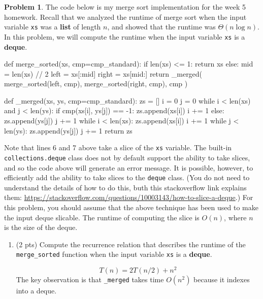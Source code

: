 \documentclass[12pt]{exam}
\theoremstyle{definition}
\newtheorem{problem}{Problem}
\begin{document}
\newpage
\begin{problem}
    The code below is my merge sort implementation for the week 5 homework.
    Recall that we analyzed the runtime of merge sort when the input variable \lstinline{xs} was a \textbf{list} of length $n$,
    and showed that the runtime was $\Theta(n \log n)$.
    In this problem, we will compute the runtime when the input variable \lstinline{xs} is a \textbf{deque}.
\begin{python}
def merge_sorted(xs, cmp=cmp_standard):
    if len(xs) <= 1:
        return xs
    else:
        mid = len(xs) // 2
        left = xs[:mid]
        right = xs[mid:]
        return _merged(
            merge_sorted(left, cmp),
            merge_sorted(right, cmp),
            cmp
            )

def _merged(xs, ys, cmp=cmp_standard):
    zs = []
    i = 0
    j = 0
    while i < len(xs) and j < len(ys):
        if cmp(xs[i], ys[j]) == -1:
            zs.append(xs[i])
            i += 1
        else:
            zs.append(ys[j])
            j += 1
    while i < len(xs):
        zs.append(xs[i])
        i += 1
    while j < len(ys):
        zs.append(ys[j])
        j += 1
    return zs
\end{python}
    \noindent
    Note that lines 6 and 7 above take a slice of the \lstinline{xs} variable.
    The built-in \lstinline{collections.deque} class does not by default support the ability to take slices,
    and so the code above will generate an error message.
    It is possible, however, to efficiently add the ability to take slices to the \lstinline{deque} class.
    (You do not need to understand the details of how to do this, buth this stackoverflow link explains them: \url{https://stackoverflow.com/questions/10003143/how-to-slice-a-deque}.)
    For this problem, you should assume that the above technique has been used to make the input deque slicable.
    The runtime of computing the slice is $O(n)$, where $n$ is the size of the deque.
    \newpage
    \begin{enumerate}
        \item
            (2 pts)
            Compute the recurrence relation that describes the runtime of the \lstinline{merge_sorted} function when the input variable \lstinline{xs} is a \textbf{deque}.
            \begin{solution}
                $$
                T(n) = 2T(n/2) + n^2
                $$
            The key observation is that \lstinline{_merged} takes time $O(n^2)$ because it indexes into a deque.
            \end{solution}
            \vspace{4in}


\end{enumerate}
\end{problem}
\end{document}

